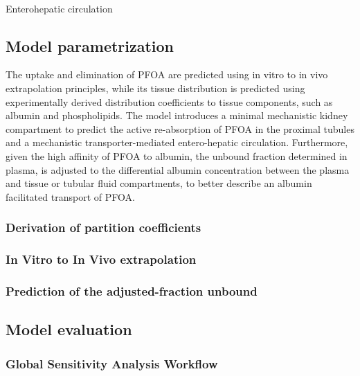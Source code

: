 \documentclass[
  authoryear,
  preprint]{elsarticle}
\makeatletter
\let\oldparagraph\paragraph
\renewcommand{\paragraph}{
    \@ifstar
      \xxxParagraphStar
      \xxxParagraphNoStar
  }
\newcommand{\xxxParagraphStar}[1]{\oldparagraph*{#1}\mbox{}}
\newcommand{\xxxParagraphNoStar}[1]{\oldparagraph{#1}\mbox{}}
\makeatother
\begin{document}
\paragraph{Enterohepatic circulation}\label{enterohepatic-circulation}

\subsection{Model parametrization}\label{model-parametrization}

The uptake and elimination of PFOA are predicted using in vitro to in
vivo extrapolation principles, while its tissue distribution is
predicted using experimentally derived distribution coefficients to
tissue components, such as albumin and phospholipids. The model
introduces a minimal mechanistic kidney compartment to predict the
active re-absorption of PFOA in the proximal tubules and a mechanistic
transporter-mediated entero-hepatic circulation. Furthermore, given the
high affinity of PFOA to albumin, the unbound fraction determined in
plasma, is adjusted to the differential albumin concentration between
the plasma and tissue or tubular fluid compartments, to better describe
an albumin facilitated transport of PFOA.

\subsubsection{Derivation of partition
coefficients}\label{derivation-of-partition-coefficients}

\subsubsection{In Vitro to In Vivo
extrapolation}\label{in-vitro-to-in-vivo-extrapolation}

\subsubsection{Prediction of the adjusted-fraction
unbound}\label{prediction-of-the-adjusted-fraction-unbound}

\subsection{Model evaluation}\label{model-evaluation}

\subsubsection{Global Sensitivity Analysis
Workflow}\label{global-sensitivity-analysis-workflow}
\end{document}

